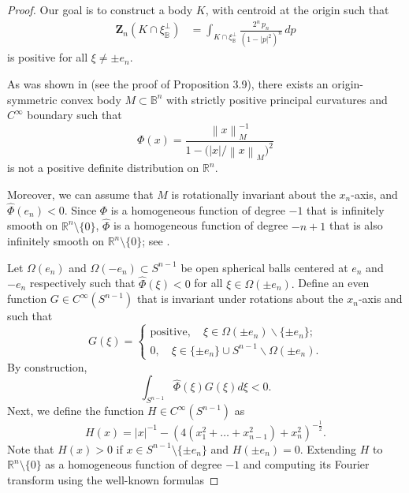 \documentclass[12pt,letterpaper,reqno]{amsart}
\newcommand{\norm}[1]{\left\lVert #1 \right\rVert}
\theoremstyle{definition}
\begin{document}
\begin{proof}

Our goal is to construct a body $K$, with centroid at the origin such that
\begin{align}
	\bm{Z}_n(K\cap\xi_{\mathbb{B}}^\perp)
	&= \int_{K\cap\xi_{\mathbb{B}}^\perp}\frac{2^{n}\,p_n}{(1-|p|^2)^{n}}\,dp\label{eq:Zvecsec-unif}
\end{align}
is positive for all $\xi \ne \pm e_n$.

As was shown in \cite{Y1} (see the proof of Proposition 3.9), there exists 
   an origin-symmetric convex body  $M\subset \mathbb B^n$ with strictly positive principal curvatures and $C^\infty$ boundary such that 
 $$	\Phi(x)=\frac{\norm{x}_M^{-1}}{1-\bigl(|x|/\norm{x}_M\bigr)^2}$$
 is not a positive definite distribution on $\mathbb R^n$.	
 
 Moreover, we can assume that $M$ is rotationally invariant about the $x_n$-axis, and $\widehat\Phi (e_n)<0$. Since $\Phi$ is a homogeneous function of degree $-1$ that is infinitely smooth on $\mathbb R^n \setminus\{0\}$, $\widehat\Phi$ is a homogeneous function of degree $-n+1$ that is also infinitely smooth on $\mathbb R^n \setminus\{0\}$; see \cite[Corollary 3.17]{K}.  
 


	
 Let $\Omega(e_n)$ and $\Omega(-e_n) \subset S^{n-1}$ be  open spherical balls centered at $e_n$ and $-e_n$ respectively such that $\widehat\Phi(\xi) < 0$ for all $\xi \in \Omega(\pm e_n).$   Define an even function $G \in C^{\infty}(S^{n-1})$ that is invariant under rotations about the $x_n$-axis and such that
	$$
	G(\xi)  = \begin{cases}
		\text{positive}, \quad \xi \in \Omega(\pm e_n) \backslash \{\pm e_n\};\\
		0, \quad \xi \in \{\pm e_n\} \cup S^{n-1} \backslash \Omega(\pm e_n).
	\end{cases}
	$$
	By construction,
\begin{equation}\label{int_G}
	\int_{S^{n-1}}\widehat\Phi(\xi) G(\xi) d\xi < 0.
\end{equation}
	Next, we define the function $H \in C^{\infty}(S^{n-1})$ as 
	$$
	H(x) = |x|^{-1} - (4(x_1^2 + \dots + x_{n-1}^2) + x_n^2)^{-\frac12}.
	$$
	Note that $H(x) > 0$ if $x\in S^{n-1}\setminus\{\pm e_n\}$ and $H(\pm e_n) = 0$.  Extending $H$ to $\mathbb R^n\setminus\{ 0\}$ as a homogeneous function of degree $-1$ and computing its Fourier transform using the well-known formulas 
	

\end{proof}
\end{document}
